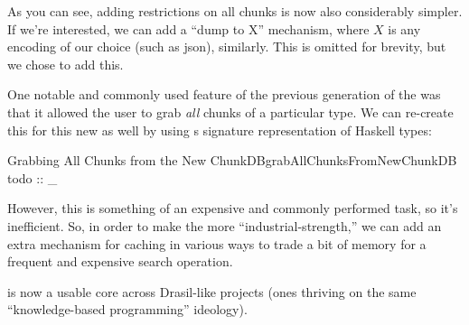 As you can see, adding restrictions on all chunks is now also considerably
simpler. If we're interested, we can add a ``dump to X'' mechanism, where $X$ is
any encoding of our choice (such as \acs{json}), similarly. This is omitted for
brevity, but we chose to add this.


One notable and commonly used feature of the previous generation of the
\ChunkDB{} was that it allowed the user to grab \textit{all} chunks of a
particular type. We can re-create this for this new \ChunkDB{} as well by using
s \TypeRep{} signature representation of Haskell types:

\begin{pseudohaskell}{Grabbing All Chunks from the New ChunkDB}{grabAllChunksFromNewChunkDB}
todo :: _
\end{pseudohaskell}


However, this is something of an expensive and commonly performed task, so it's
inefficient. So, in order to make the \ChunkDB{} more ``industrial-strength,''
we can add an extra mechanism for caching in various ways to trade a bit of
memory for a frequent and expensive search operation.


\ChunkDB{} is now a usable core across Drasil-like projects (ones thriving on
the same ``knowledge-based programming'' ideology).





